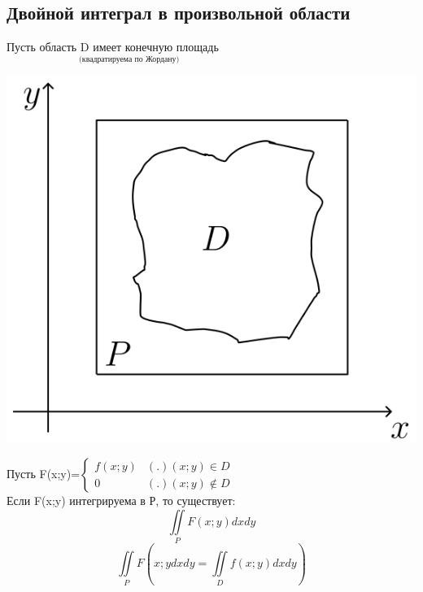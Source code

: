 \documentclass[12pt]{article}
\let\ORIincludegraphics\includegraphics
\renewcommand{\includegraphics}[2][]{\ORIincludegraphics[scale=0.65,#1]{#2}}
\let\oldiint\iint
\renewcommand{\iint}{\oldiint\limits}
\begin{document}
  \subsection{Двойной интеграл в произвольной области}
  Пусть $\underset{\text{(квадратируема по Жордану)}}{\text{область D имеет конечную площадь}}$\\
  \begin{minipage}{0.45\textwidth}
    \includegraphics[scale=0.7]{8.12.1.png}
  \end{minipage}
  \hspace{1em}
  \begin{minipage}{0.55\textwidth}
    Пусть F(x;y)=$\begin{cases}
      f(x;y) & (.)(x;y) \in D\\
      0 & (.)(x;y) \not \in D
    \end{cases}$\\
    Если F(x;y) интегрируема в Р, то существует: \[\iint_{P} F(x;y)dxdy \]
    \[\iint_{P} F(x;y dxdy=\iint_{D} f(x;y)dxdy)\]
  \end{minipage}
  \vspace{1em}
  \par
\end{document}
